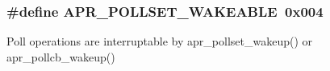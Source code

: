 \subsubsection[{\texorpdfstring{A\+P\+R\+\_\+\+P\+O\+L\+L\+S\+E\+T\+\_\+\+W\+A\+K\+E\+A\+B\+LE}{APR_POLLSET_WAKEABLE}}]{\setlength{\rightskip}{0pt plus 5cm}\#define A\+P\+R\+\_\+\+P\+O\+L\+L\+S\+E\+T\+\_\+\+W\+A\+K\+E\+A\+B\+LE~0x004}\hypertarget{group__pollflags_ga552d7f28d442602e6c9bb6931f183493}{}\label{group__pollflags_ga552d7f28d442602e6c9bb6931f183493}
Poll operations are interruptable by apr\+\_\+pollset\+\_\+wakeup() or apr\+\_\+pollcb\+\_\+wakeup() 
